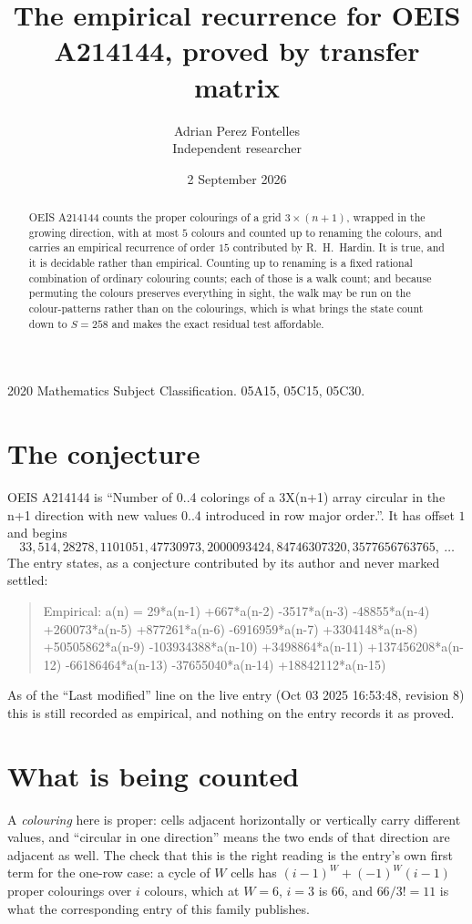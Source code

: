 \documentclass[11pt,a4paper]{article}
\title{The empirical recurrence for OEIS A214144, proved by transfer matrix}
\author{Adrian Perez Fontelles\\ \small Independent researcher}
\date{2 September 2026}
\theoremstyle{plain}
\theoremstyle{definition}
\begin{document}
\maketitle

\begin{abstract}
OEIS A214144 counts the proper colourings of a grid $3\times(n+1)$, wrapped in the growing direction, with at most $5$ colours and
counted up to renaming the colours, and carries an empirical recurrence of order $15$
contributed by R.~H.~Hardin. It is true, and it is decidable rather than empirical. Counting
up to renaming is a fixed rational combination of ordinary colouring counts; each of those is
a walk count; and because permuting the colours preserves everything in sight, the walk may be
run on the colour-patterns rather than on the colourings, which is what brings the state count
down to $S=258$ and makes the exact residual test affordable.
\end{abstract}

\noindent\small 2020 Mathematics Subject Classification. 05A15, 05C15, 05C30.\normalsize

\section{The conjecture}

OEIS A214144 is ``Number of 0..4 colorings of a 3X(n+1) array circular in the n+1 direction with new values 0..4 introduced in row major order.''. It has offset $1$ and begins
\[
33, 514, 28278, 1101051, 47730973, 2000093424, 84746307320, 3577656763765,\ \dots
\]
The entry states, as a conjecture contributed by its author and never marked settled:
\begin{quote}
Empirical: a(n) = 29*a(n-1) +667*a(n-2) -3517*a(n-3) -48855*a(n-4) +260073*a(n-5) +877261*a(n-6) -6916959*a(n-7) +3304148*a(n-8) +50505862*a(n-9) -103934388*a(n-10) +3498864*a(n-11) +137456208*a(n-12) -66186464*a(n-13) -37655040*a(n-14) +18842112*a(n-15)
\end{quote}
As of the ``Last modified'' line on the live entry (Oct 03 2025 16:53:48, revision 8) this is still
recorded as empirical, and nothing on the entry records it as proved.

\section{What is being counted}

A \emph{colouring} here is proper: cells adjacent horizontally or vertically carry different
values, and ``circular in one direction'' means the two ends of that direction are adjacent as
well. The check that this is the right reading is the entry's own first term for the
one-row case: a cycle of $W$ cells has $(i-1)^W+(-1)^W(i-1)$ proper colourings over $i$
colours, which at $W=6$, $i=3$ is $66$, and $66/3!=11$ is what the corresponding entry of this
family publishes.
\end{document}
